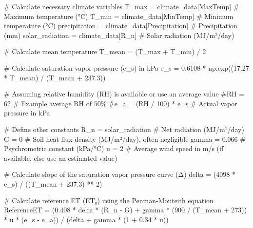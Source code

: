 \documentclass[
  letterpaper,
  DIV=11,
  numbers=noendperiod]{scrartcl}
\newenvironment{Shaded}{\begin{snugshade}}{\end{snugshade}}
\newcommand{\CommentTok}[1]{\textcolor[rgb]{0.37,0.37,0.37}{#1}}
\newcommand{\DecValTok}[1]{\textcolor[rgb]{0.68,0.00,0.00}{#1}}
\newcommand{\FloatTok}[1]{\textcolor[rgb]{0.68,0.00,0.00}{#1}}
\newcommand{\NormalTok}[1]{\textcolor[rgb]{0.00,0.23,0.31}{#1}}
\newcommand{\OperatorTok}[1]{\textcolor[rgb]{0.37,0.37,0.37}{#1}}
\newcommand{\StringTok}[1]{\textcolor[rgb]{0.13,0.47,0.30}{#1}}
\begin{document}
\begin{Shaded}
\begin{Highlighting}[]
    \CommentTok{\# Calculate necessary climate variables}
\NormalTok{    T\_max }\OperatorTok{=}\NormalTok{ climate\_data[}\StringTok{\textquotesingle{}MaxTemp\textquotesingle{}}\NormalTok{]  }\CommentTok{\# Maximum temperature (°C)}
\NormalTok{    T\_min }\OperatorTok{=}\NormalTok{ climate\_data[}\StringTok{\textquotesingle{}MinTemp\textquotesingle{}}\NormalTok{]  }\CommentTok{\# Minimum temperature (°C)}
\NormalTok{    precipitation }\OperatorTok{=}\NormalTok{ climate\_data[}\StringTok{\textquotesingle{}Precipitation\textquotesingle{}}\NormalTok{]  }\CommentTok{\# Precipitation (mm)}
\NormalTok{    solar\_radiation }\OperatorTok{=}\NormalTok{ climate\_data[}\StringTok{\textquotesingle{}R\_n\textquotesingle{}}\NormalTok{]  }\CommentTok{\# Solar radiation (MJ/m²/day)}

    \CommentTok{\# Calculate mean temperature}
\NormalTok{    T\_mean }\OperatorTok{=}\NormalTok{ (T\_max }\OperatorTok{+}\NormalTok{ T\_min) }\OperatorTok{/} \DecValTok{2}

    \CommentTok{\# Calculate saturation vapor pressure (e\_s) in kPa}
\NormalTok{    e\_s }\OperatorTok{=} \FloatTok{0.6108} \OperatorTok{*}\NormalTok{ np.exp((}\FloatTok{17.27} \OperatorTok{*}\NormalTok{ T\_mean) }\OperatorTok{/}\NormalTok{ (T\_mean }\OperatorTok{+} \FloatTok{237.3}\NormalTok{))}

    \CommentTok{\# Assuming relative humidity (RH) is available or use an average value}
    \CommentTok{\#RH = 62  \# Example average RH of 50\%}
    \CommentTok{\#e\_a = (RH / 100) * e\_s  \# Actual vapor pressure in kPa}

    \CommentTok{\# Define other constants}
\NormalTok{    R\_n }\OperatorTok{=}\NormalTok{ solar\_radiation  }\CommentTok{\# Net radiation (MJ/m²/day)}
\NormalTok{    G }\OperatorTok{=} \DecValTok{0}  \CommentTok{\# Soil heat flux density (MJ/m²/day), often negligible}
\NormalTok{    gamma }\OperatorTok{=} \FloatTok{0.066}  \CommentTok{\# Psychrometric constant (kPa/°C)}
\NormalTok{    u }\OperatorTok{=} \DecValTok{2}  \CommentTok{\# Average wind speed in m/s (if available, else use an estimated value)}

    \CommentTok{\# Calculate slope of the saturation vapor pressure curve (Δ)}
\NormalTok{    delta }\OperatorTok{=}\NormalTok{ (}\DecValTok{4098} \OperatorTok{*}\NormalTok{ e\_s) }\OperatorTok{/}\NormalTok{ ((T\_mean }\OperatorTok{+} \FloatTok{237.3}\NormalTok{) }\OperatorTok{**} \DecValTok{2}\NormalTok{)}

    \CommentTok{\# Calculate reference ET (ET₀) using the Penman{-}Monteith equation}
\NormalTok{    ReferenceET }\OperatorTok{=}\NormalTok{ (}\FloatTok{0.408} \OperatorTok{*}\NormalTok{ delta }\OperatorTok{*}\NormalTok{ (R\_n }\OperatorTok{{-}}\NormalTok{ G) }\OperatorTok{+}\NormalTok{ gamma }\OperatorTok{*}\NormalTok{ (}\DecValTok{900} \OperatorTok{/}\NormalTok{ (T\_mean }\OperatorTok{+} \DecValTok{273}\NormalTok{)) }\OperatorTok{*}\NormalTok{ u }\OperatorTok{*}\NormalTok{ (e\_s }\OperatorTok{{-}}\NormalTok{ e\_a)) }\OperatorTok{/}\NormalTok{ (delta }\OperatorTok{+}\NormalTok{ gamma }\OperatorTok{*}\NormalTok{ (}\DecValTok{1} \OperatorTok{+} \FloatTok{0.34} \OperatorTok{*}\NormalTok{ u))}


\end{Highlighting}
\end{Shaded}
\end{document}
